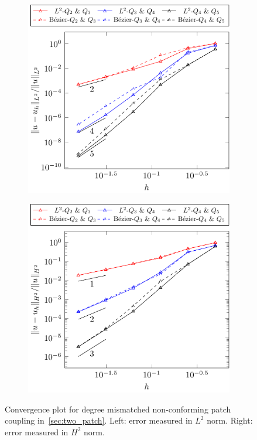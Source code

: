 \documentclass[preprint,12pt]{elsarticle}
\theoremstyle{remark}
\begin{document}
\begin{figure}[hbt]
    \centering
    \begin{subfigure}[b]{0.48\textwidth}
        \includegraphics[width=\textwidth]{two_patch_biharmonic_diff_degree}
    \end{subfigure}
    \begin{subfigure}[b]{0.48\textwidth}
        \includegraphics[width=\textwidth]{two_patch_biharmonic_diff_degree_H2}
    \end{subfigure}
	\caption{Convergence plot for degree mismatched non-conforming patch coupling in~\ref{sec:two_patch}. Left: error measured in $L^2$ norm. Right: error measured in $H^2$ norm.}\label{fig:two_patc_biharmonic_convergence_diff_degree}
\end{figure}
\end{document}
